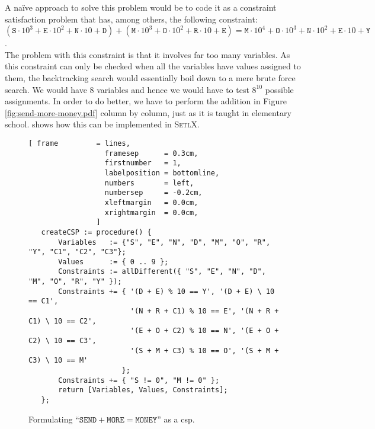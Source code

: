 \noindent
A na\"ive approach to solve this problem would be to code it as a constraint satisfaction problem that has,
among others,  the
following constraint:
\\[0.2cm]
\hspace*{1.3cm}
$   (\texttt{S} \cdot 10^3 + \texttt{E} \cdot 10^2 + \texttt{N} \cdot 10 + \texttt{D}) 
  + (\texttt{M} \cdot 10^3 + \texttt{O} \cdot 10^2 + \texttt{R} \cdot 10 + \texttt{E})
  = \texttt{M} \cdot 10^4 + \texttt{O} \cdot 10^3 + \texttt{N} \cdot 10^2 + \texttt{E} \cdot 10 + \texttt{Y}
$.
\\[0.2cm]
The problem with this constraint is that it involves far too many variables.  As this constraint can only be
checked when all the variables have values assigned to them, the backtracking search would essentially
boil down to a mere brute force search.  We would have 8 variables and hence we would have to test $8^{10}$
possible assignments. In order to do better, we have to perform the addition in Figure
 \ref{fig:send-more-money.pdf} column by column, just as it is taught in elementary school.
  shows how this can be implemented in \textsc{SetlX}.

\begin{figure}[!ht]
\centering
\begin{Verbatim}[ frame         = lines, 
                  framesep      = 0.3cm, 
                  firstnumber   = 1,
                  labelposition = bottomline,
                  numbers       = left,
                  numbersep     = -0.2cm,
                  xleftmargin   = 0.0cm,
                  xrightmargin  = 0.0cm,
                ]
   createCSP := procedure() {
       Variables   := {"S", "E", "N", "D", "M", "O", "R", "Y", "C1", "C2", "C3"};
       Values      := { 0 .. 9 };
       Constraints := allDifferent({ "S", "E", "N", "D", "M", "O", "R", "Y" });
       Constraints += { '(D + E) % 10 == Y', '(D + E) \ 10 == C1',
                        '(N + R + C1) % 10 == E', '(N + R + C1) \ 10 == C2',
                        '(E + O + C2) % 10 == N', '(E + O + C2) \ 10 == C3',
                        '(S + M + C3) % 10 == O', '(S + M + C3) \ 10 == M'
                      };
       Constraints += { "S != 0", "M != 0" };
       return [Variables, Values, Constraints];
   };
\end{Verbatim}
\vspace*{-0.3cm}
\caption{Formulating ``$\texttt{SEND} + \texttt{MORE} = \texttt{MONEY}$'' as a \ac{csp}.}
\label{fig:send-more-money.stlx}
\end{figure}

